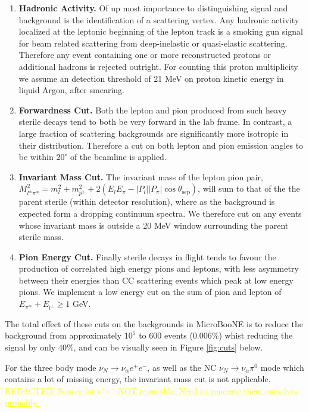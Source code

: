\documentclass[11pt, a4paper]{article}
\newcommand{\newtext}[2]{\textcolor{#1}{\ul{#2}}}
\begin{document}
\begin{enumerate}
	\item {\bf Hadronic Activity.} Of up most importance to distinguishing signal and background is the identification of a scattering vertex. Any hadronic activity localized at the leptonic beginning of the lepton track is a smoking gun signal for beam related scattering from deep-inelastic or quasi-elastic scattering. Therefore any event containing one or more reconstructed protons or additional hadrons is rejected outright. For counting this proton multiplicity we assume an detection threshold of 21 MeV on proton kinetic energy in liquid Argon, after smearing.
	\item {\bf Forwardness Cut.} Both the lepton and pion produced from such heavy sterile decays tend to both be very forward in the lab frame. In contrast, a large fraction of scattering backgrounds are significantly more isotropic in their distribution. Therefore a cut on both lepton and pion emission angles to be within $20^\circ$ of the beamline is applied.
	\item {\bf Invariant Mass Cut.} The invariant mass of the lepton pion pair, $M_{l^\pm \pi^\mp}^2=m_l^2+m_{p^\pm}^2+ 2(E_l E_\pi - |P_l||P_\pi|\cos\theta_\text{sep})$, will sum to that of the the parent sterile (within detector resolution), where as the background is expected form a dropping continuum spectra. We therefore cut on any events whose invariant mass is outside a 20 MeV window surrounding the parent sterile mass.
	\item {\bf Pion Energy Cut.} Finally sterile decays in flight tends to favour the production of correlated high energy pions and leptons, with less asymmetry between their energies than CC scattering events which peak at low energy pions. We implement a low energy cut on the sum of pion and lepton of $E_{\pi^\mp}+E_{l^\pm} \geq 1$ GeV.

\end{enumerate}
The total effect of these cuts on the backgrounds in MicroBooNE is to reduce the background from approximately $10^5$ to 600 events (0.006\%) whist reducing the signal by only 40\%, and can be visually seen in Figure \ref{fig:cuts} below. 

For the three body mode $\nu_N \rightarrow \nu_\alpha e^+ e^-$, as well as the NC $\nu_N \rightarrow \nu_\alpha \pi^0$ mode which contains a lot of missing energy, the invariant mass cut is not applicable. \newtext{MARK}{REDACTED! Source for $e^+e^-$ NOT reputable. Need to generate them ourselves probably.}
\end{document}
